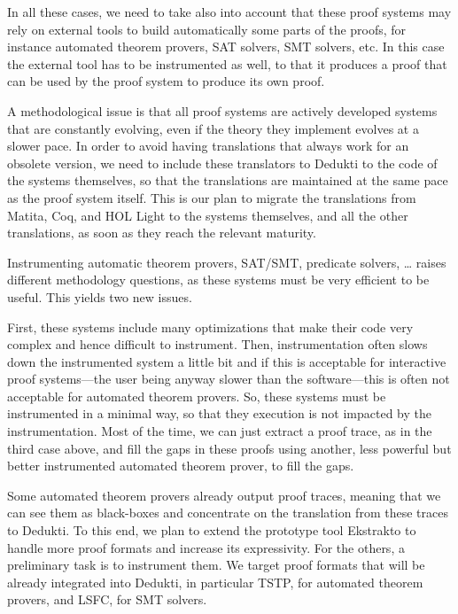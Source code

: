 In all these cases, we need to take also into account that these proof
systems may rely on external tools to build automatically some parts
of the proofs, for instance automated theorem provers, SAT solvers,
SMT solvers, etc. In this case the external tool has to be
instrumented as well, to that it produces a proof that can be used by
the proof system to produce its own proof.

A methodological issue is that all proof systems are actively
developed systems that are constantly evolving, even if the theory
they implement evolves at a slower pace. In order to avoid having
translations that always work for an obsolete version, we need to
include these translators to Dedukti to the code of the systems
themselves, so that the translations are maintained at the same pace
as the proof system itself. This is our plan to migrate the
translations from Matita, Coq, and HOL Light to the systems
themselves, and all the other translations, as soon as they reach the
relevant maturity.


Instrumenting automatic theorem provers, SAT/SMT, predicate solvers,
\dots
raises different methodology questions, as these systems
must be very efficient to be useful. This yields two new issues.

First, these systems include many optimizations that make their code
very complex and hence difficult to instrument. Then, instrumentation
often slows down the instrumented system a little bit and if this is
acceptable for interactive proof systems---the user being anyway
slower than the software---this is often not acceptable for automated
theorem provers.
So, these systems must be instrumented in a minimal way, so that they
execution is not impacted by the instrumentation.  Most of the
time, we can just extract a proof trace, as in the third case above,
and fill the gaps in these proofs using another, less powerful but better
instrumented automated theorem prover, to fill the gaps.

Some automated theorem provers already output proof traces, meaning
that we can see them as black-boxes and concentrate on the translation
from these traces to Dedukti. To this end, we plan to extend the
prototype tool Ekstrakto to handle more proof formats and increase its
expressivity.
For the others, a preliminary task is to instrument them.  We target
proof formats that will be already integrated into Dedukti, in
particular TSTP, for automated theorem provers, and LSFC, for SMT solvers.

